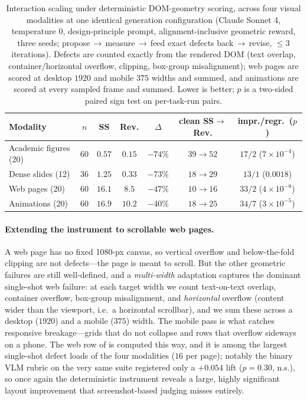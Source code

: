 \begin{table}[t]
  \centering
  \caption{Interaction scaling under deterministic DOM-geometry scoring, across
  four visual modalities at one identical generation configuration (Claude
  Sonnet 4, temperature $0$, design-principle prompt, alignment-inclusive
  geometric reward, three seeds; propose\,$\to$\,measure\,$\to$\,feed exact
  defects back\,$\to$\,revise, $\le 3$ iterations). Defects are counted exactly
  from the rendered DOM (text overlap, container/horizontal overflow, clipping,
  box-group misalignment); web pages are scored at desktop $1920$ and mobile
  $375$ widths and summed, and animations are scored at every sampled frame and
  summed. Lower is better; $p$ is a two-sided paired sign test on per-task-run
  pairs.}
  \label{tab:geometric}
  \small
  \begin{tabular}{lcccccc}
    \toprule
    Modality & $n$ & SS & Rev. & $\Delta$ & clean SS$\to$Rev. & impr./regr.\ ($p$) \\
    \midrule
    Academic figures (20) & 60 & $0.57$ & $0.15$ & $-74\%$ & $39\to52$ & $17/2$ \;($7{\times}10^{-4}$) \\
    Dense slides (12)     & 36 & $1.25$ & $0.33$ & $-73\%$ & $18\to29$ & $13/1$ \;($0.0018$) \\
    Web pages (20)        & 60 & $16.1$ & $8.5$  & $-47\%$ & $10\to16$ & $33/2$ \;($4{\times}10^{-8}$) \\
    Animations (20)       & 60 & $16.9$ & $10.2$ & $-40\%$ & $18\to25$ & $34/7$ \;($3{\times}10^{-5}$) \\
    \bottomrule
  \end{tabular}
\end{table}

\paragraph{Extending the instrument to scrollable web pages.}
\label{sec:web-geometry}
A web page has no fixed 1080-px canvas, so vertical overflow and below-the-fold
clipping are not defects---the page is meant to scroll. But the other geometric
failures are still well-defined, and a \emph{multi-width} adaptation captures the
dominant single-shot web failure: at each target width we count text-on-text
overlap, container overflow, box-group misalignment, and \emph{horizontal}
overflow (content wider than the viewport, i.e.\ a horizontal scrollbar), and we
sum these across a desktop ($1920$) and a mobile ($375$) width. The mobile pass is
what catches responsive breakage---grids that do not collapse and rows that
overflow sideways on a phone. The web row of  is computed this
way, and it is among the largest single-shot defect loads of the four modalities ($16$
per page); notably the binary VLM rubric on the very same suite registered only a
$+0.054$ lift ($p=0.30$, n.s.), so once again the deterministic instrument reveals
a large, highly significant layout improvement that screenshot-based judging
misses entirely.

